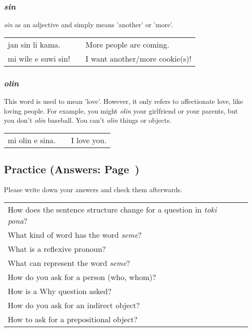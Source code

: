 %
\subsubsection*{\textit{sin}}
%
\textit{sin} as an adjective and simply means 'another' or 'more'. 

\begin{supertabular}{p{5,5cm}|ll}
jan sin li kama. && More people are coming. \\
mi wile e suwi sin! && I want another/more cookie(s)! \\
\end{supertabular} 

%
\subsubsection*{\textit{olin}}
%
This word is used to mean 'love'. 
However, it only refers to affectionate love, like loving people. 
For example, you might \textit{olin} your girlfriend or your parents, but you don't \textit{olin} baseball. 
You can't \textit{olin} things or objects. 

\begin{supertabular}{p{5,5cm}|ll}
mi olin e sina. && I love you. \\
\end{supertabular}  

%
%
\newpage
\subsection*{Practice (Answers: Page~\pageref{'questions_using_seme'})}
%
Please write down your answers and check them afterwards. 

\begin{supertabular}{p{5,5cm}|ll}
How does the sentence structure change for a question in \textit{toki pona}? &&  \\ %
What kind of word has the word \textit{seme}? &&  \\ %
What is a reflexive pronoun? &&  \\ %
What can represent the word \textit{seme}? &&   \\ %
How do you ask for a person (who, whom)? &&  \\ %
How is a Why question asked? &&  \\ %
How do you ask for an indirect object? &&  \\ %
How to ask for a prepositional object? &&  \\ %
\end{supertabular}

